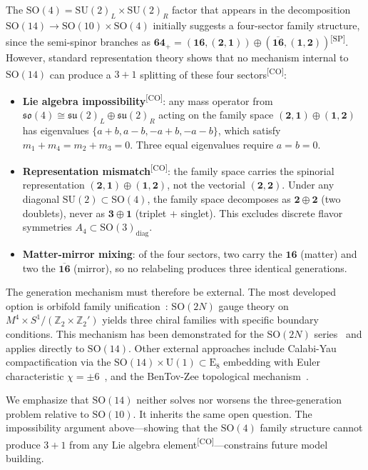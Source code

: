 \documentclass[aps,prd,twocolumn,showpacs,preprintnumbers,superscriptaddress,floatfix]{revtex4-2}
\newcommand{\so}{\mathfrak{so}}
\newcommand{\su}{\mathfrak{su}}
\newcommand{\CO}{\textsuperscript{[CO]}}
\newcommand{\SP}{\textsuperscript{[SP]}}
\begin{document}
The $\mathrm{SO}(4) = \mathrm{SU}(2)_L \times \mathrm{SU}(2)_R$ factor
that appears in the decomposition $\mathrm{SO}(14) \to \mathrm{SO}(10) \times
\mathrm{SO}(4)$ initially suggests a four-sector family structure, since the
semi-spinor branches as
$\mathbf{64}_+ = (\mathbf{16}, (\mathbf{2},\mathbf{1})) \oplus
(\overline{\mathbf{16}}, (\mathbf{1},\mathbf{2}))$\SP.
However, standard representation theory shows that no mechanism internal to $\mathrm{SO}(14)$ can produce a
$3+1$ splitting of these four sectors\CO:
\begin{itemize}
\item \textbf{Lie algebra impossibility}\CO: any mass operator from
  $\so(4) \cong \su(2)_L \oplus \su(2)_R$ acting on the family space
  $(\mathbf{2},\mathbf{1}) \oplus (\mathbf{1},\mathbf{2})$ has eigenvalues
  $\{a+b, a-b, -a+b, -a-b\}$, which satisfy $m_1 + m_4 = m_2 + m_3 = 0$.
  Three equal eigenvalues require $a = b = 0$.
\item \textbf{Representation mismatch}\CO: the family space carries the
  spinorial representation $(\mathbf{2},\mathbf{1}) \oplus (\mathbf{1},\mathbf{2})$,
  not the vectorial $(\mathbf{2},\mathbf{2})$.  Under any diagonal
  $\mathrm{SU}(2) \subset \mathrm{SO}(4)$, the family space decomposes as
  $\mathbf{2} \oplus \mathbf{2}$ (two doublets), never as
  $\mathbf{3} \oplus \mathbf{1}$ (triplet $+$ singlet).  This excludes
  discrete flavor symmetries $A_4 \subset \mathrm{SO}(3)_\text{diag}$.
\item \textbf{Matter-mirror mixing}: of the four sectors, two carry the
  $\mathbf{16}$ (matter) and two the $\overline{\mathbf{16}}$ (mirror),
  so no relabeling produces three identical generations.
\end{itemize}

The generation mechanism must therefore be external.  The most developed
option is orbifold family unification~\cite{kawamura2010}: $\mathrm{SO}(2N)$
gauge theory on $M^4 \times S^1 / (\mathbb{Z}_2 \times \mathbb{Z}_2')$
yields three chiral families with specific boundary conditions.  This
mechanism has been demonstrated for the $\mathrm{SO}(2N)$
series~\cite{maru2025} and applies directly to $\mathrm{SO}(14)$.
Other external approaches include Calabi-Yau compactification via the
$\mathrm{SO}(14) \times \mathrm{U}(1) \subset \mathrm{E}_8$ embedding
with Euler characteristic $\chi = \pm 6$~\cite{candelas1985}, and the
BenTov-Zee topological mechanism~\cite{bentov2016}.

We emphasize that $\mathrm{SO}(14)$ neither solves nor worsens the
three-generation problem relative to $\mathrm{SO}(10)$.  It inherits
the same open question.  The impossibility argument above---showing that
the $\mathrm{SO}(4)$ family structure cannot produce $3+1$ from any Lie
algebra element\CO---constrains future model
building.
\end{document}
